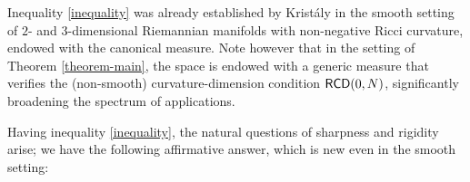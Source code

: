 \documentclass[11pt, reqno]{amsart}
\numberwithin{equation}{section}
\begin{document}
		 Inequality \eqref{inequality} was already established by Krist\'aly \cite[Theorem 1.4]{Kristaly-GAFA} in the smooth setting of $2$- and $3$-dimensional Riemannian manifolds with non-negative Ricci curvature, endowed with the canonical measure. Note however that in the setting of Theorem \ref{theorem-main}, the space is endowed with a generic measure that verifies the (non-smooth) curvature-dimension condition ${\sf RCD}(0,N)$, significantly broadening  the spectrum of applications.     
		 
		Having inequality \eqref{inequality}, the natural questions of sharpness and rigidity arise;  we have the following affirmative answer, which  is new even in the smooth setting: 
		
		
		
		
		
		
		
\end{document}

